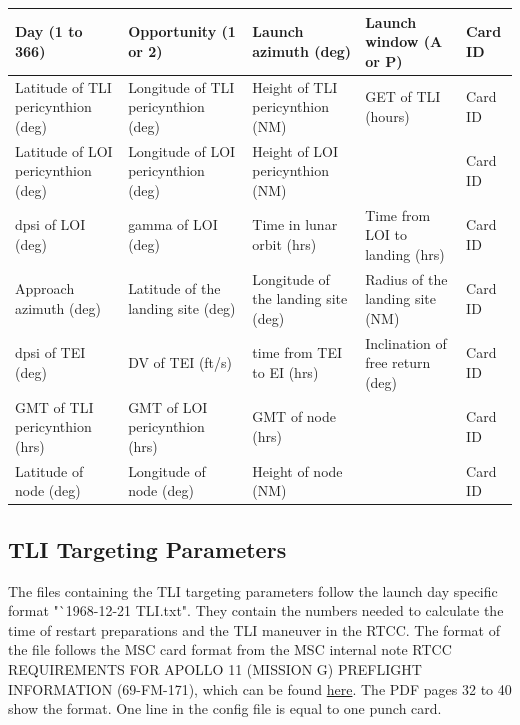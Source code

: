 \documentclass[11pt]{article} %
\begin{document}
\begin{tabular}{|L{2.9cm}|L{2.9cm}|L{2.8cm}|L{2.8cm}|L{1.4cm}|}
\hline
Day (1 to 366)&Opportunity (1 or 2)&Launch azimuth (deg)&Launch window (A or P)&Card ID\\
\hline
Latitude of TLI pericynthion (deg)&Longitude of TLI pericynthion (deg)&Height of TLI pericynthion (NM)&GET of TLI (hours)&Card ID\\
\hline
Latitude of LOI pericynthion (deg)&Longitude of LOI pericynthion (deg)&Height of LOI pericynthion (NM)&&Card ID\\
\hline
dpsi of LOI (deg)&gamma of LOI (deg)&Time in lunar orbit (hrs)&Time from LOI to landing (hrs)&Card ID\\
\hline
Approach azimuth (deg)&Latitude of the landing site (deg)&Longitude of the landing site (deg)&Radius of the landing site (NM)&Card ID\\
\hline
dpsi of TEI (deg)&DV of TEI (ft/s)&time from TEI to EI (hrs)&Inclination of free return (deg)&Card ID\\
\hline
GMT of TLI pericynthion (hrs)&GMT of LOI pericynthion (hrs)&GMT of node (hrs)&&Card ID\\
\hline
Latitude of node (deg)&Longitude of node (deg)&Height of node (NM)&&Card ID\\
\hline
\end{tabular}

\newpage
\subsection{TLI Targeting Parameters}

The files containing the TLI targeting parameters follow the launch day specific format "`1968-12-21 TLI.txt". They contain the numbers needed to calculate the time of restart preparations and the TLI maneuver in the RTCC. The format of the file follows the MSC card format from the MSC internal note RTCC REQUIREMENTS FOR APOLLO 11 (MISSION G) PREFLIGHT INFORMATION (69-FM-171), which can be found \href{https://web.archive.org/web/20100524010957/http://ntrs.nasa.gov/archive/nasa/casi.ntrs.nasa.gov/19740072570_1974072570.pdf}{here}. The PDF pages 32 to 40 show the format. One line in the config file is equal to one punch card.
\end{document}
